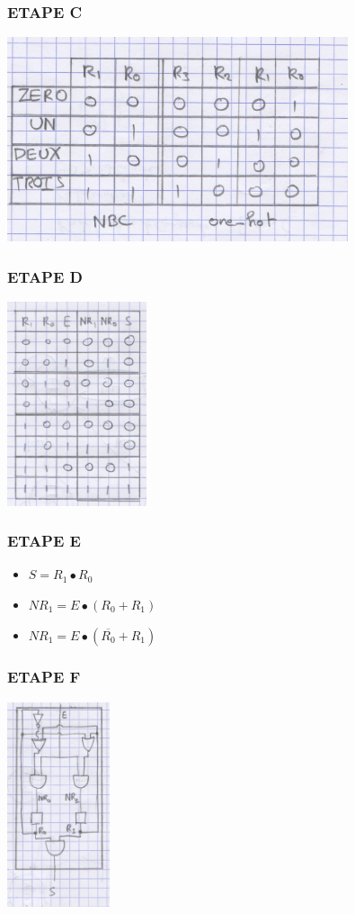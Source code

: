\subsubsection{ETAPE C}
  \begin{center}
    \includegraphics[height=6cm]{cours1/pics/truthtable.png}
  \end{center}

\subsubsection{ETAPE D}
  \begin{center}
    \includegraphics[height=6cm]{cours1/pics/equationtable.png}
  \end{center}

\subsubsection{ETAPE E}
\begin{itemize}
  \item \(S=R_1 \bullet R_0\)
  \item \(NR_1 = E \bullet {(R_0 + R_1)}\)
  \item \(NR_1 = E \bullet {(\overline{R_0} + R_1)}\)
\end{itemize}

\subsubsection{ETAPE F}
  \begin{center}
    \includegraphics[height=6cm]{cours1/pics/circuit.png}
  \end{center}


